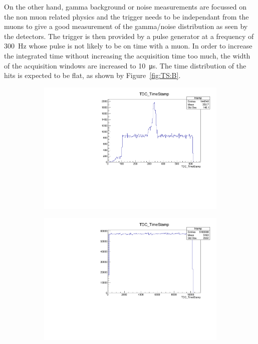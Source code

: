 	On the other hand, gamma background or noise measurements are focussed on the non muon related physics and the trigger needs to be independant from the muons to give a good measurement of the gamma/noise distribution as seen by the detectors. The trigger is then provided by a pulse generator at a frequency of \SI{300}{Hz} whose pulse is not likely to be on time with a muon. In order to increase the integrated time without increasing the acquisition time too much, the width of the acquisition windows are increased to \SI{10}{\micro s}. The time distribution of the hits is expected to be flat, as shown by Figure~\ref{fig:TS:B}.
	
	\begin{figure}[H]
        \begin{subfigure}{0.5\linewidth}
		    \centering
			\includegraphics[width = \linewidth]{fig/app2/beam_TS.pdf}
			\caption{\label{fig:TS:A}}
		\end{subfigure}
		\begin{subfigure}{0.5\linewidth}
		    \centering
			\includegraphics[width = \linewidth]{fig/app2/random_TS.pdf}

\end{subfigure}
\end{figure}
